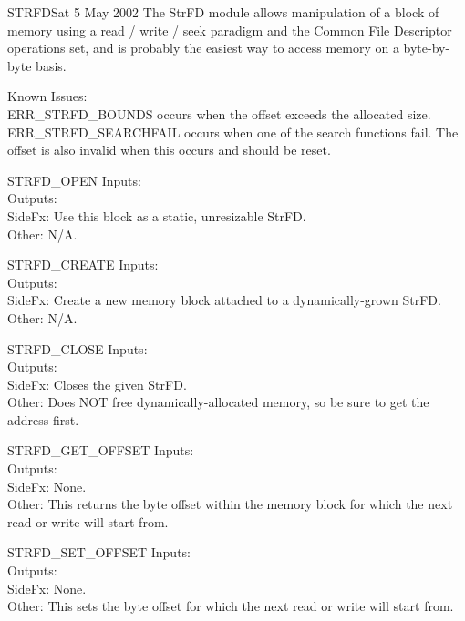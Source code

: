 \begin{scmodule}{STRFD}{\perjsk}{\perjsk}{Sat 5 May 2002}
The StrFD module allows manipulation of a block of memory using a read / write / seek
paradigm and the Common File Descriptor operations set, and is probably the easiest
way to access memory on a byte-by-byte basis.
\end{scmodule}
Known Issues:\\
ERR\_STRFD\_BOUNDS occurs when the offset exceeds the allocated size.\\
ERR\_STRFD\_SEARCHFAIL occurs when one of the search functions fail.
The offset is also invalid when this occurs and should be reset.
\begin{sccall}[]{STRFD\_OPEN}
Inputs: \\
Outputs: \\
SideFx: Use this block as a static, unresizable StrFD.\\
Other: N/A.
\end{sccall}
\begin{sccall}[]{STRFD\_CREATE}
Inputs: \\
Outputs: \\
SideFx: Create a new memory block attached to a dynamically-grown StrFD.\\
Other: N/A.
\end{sccall}
\begin{sccall}{STRFD\_CLOSE}
Inputs: \\
Outputs: \scargs{}\\
SideFx: Closes the given StrFD.\\
Other: Does NOT free dynamically-allocated memory, so be sure to get the address first.
\end{sccall}
\begin{sccall}{STRFD\_GET\_OFFSET}
Inputs: \\
Outputs: \\
SideFx: None.\\
Other: This returns the byte offset within the memory block for which the next
read or write will start from.
\end{sccall}
\begin{sccall}{STRFD\_SET\_OFFSET}
Inputs: \\
Outputs: \scargs{}\\
SideFx: None.\\
Other: This sets the byte offset for which the next read or write will start from.
\end{sccall}
